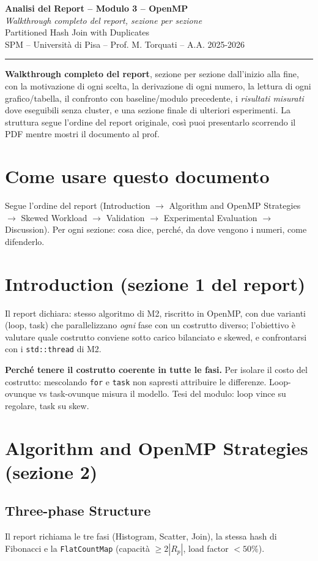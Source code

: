 \documentclass[11pt,a4paper]{article}
\newcommand{\doctitle}[2]{%
  \begin{titlepage}\centering\vspace*{2cm}
  {\LARGE\bfseries Analisi del Report -- #1\\[0.6em]}
  {\large\itshape #2}\\[1.5em]
  {\large Partitioned Hash Join with Duplicates}\\[0.4em]
  {\large SPM -- Università di Pisa -- Prof. M. Torquati -- A.A. 2025-2026}\\[2em]
  \hrule\vspace{1em}
  \begin{flushleft}\small \textbf{Walkthrough completo del report}, sezione per sezione dall'inizio alla fine, con la motivazione di ogni scelta, la derivazione di ogni numero, la lettura di ogni grafico/tabella, il confronto con baseline/modulo precedente, i \emph{risultati misurati} dove eseguibili senza cluster, e una sezione finale di ulteriori esperimenti. La struttura segue l'ordine del report originale, così puoi presentarlo scorrendo il PDF mentre mostri il documento al prof.\end{flushleft}
  \end{titlepage}
  \tableofcontents\newpage}
\begin{document}
\doctitle{Modulo 3 -- OpenMP}{Walkthrough completo del report, sezione per sezione}

\section*{Come usare questo documento}
Segue l'ordine del report (Introduction $\to$ Algorithm and OpenMP Strategies $\to$ Skewed Workload $\to$ Validation $\to$ Experimental Evaluation $\to$ Discussion). Per ogni sezione: cosa dice, perché, da dove vengono i numeri, come difenderlo.

\section{Introduction (sezione 1 del report)}

Il report dichiara: stesso algoritmo di M2, riscritto in OpenMP, con due varianti (loop, task) che parallelizzano \emph{ogni} fase con un costrutto diverso; l'obiettivo è valutare quale costrutto conviene sotto carico bilanciato e skewed, e confrontarsi con i \texttt{std::thread} di M2.

\begin{motiv}
\textbf{Perché tenere il costrutto coerente in tutte le fasi.} Per isolare il costo del costrutto: mescolando \texttt{for} e \texttt{task} non sapresti attribuire le differenze. Loop-ovunque vs task-ovunque misura il modello. Tesi del modulo: loop vince su regolare, task su skew.
\end{motiv}

\section{Algorithm and OpenMP Strategies (sezione 2)}

\subsection{Three-phase Structure}

Il report richiama le tre fasi (Histogram, Scatter, Join), la stessa hash di Fibonacci e la \texttt{FlatCountMap} (capacità $\ge2|R_p|$, load factor $<50\%$).
\end{document}
